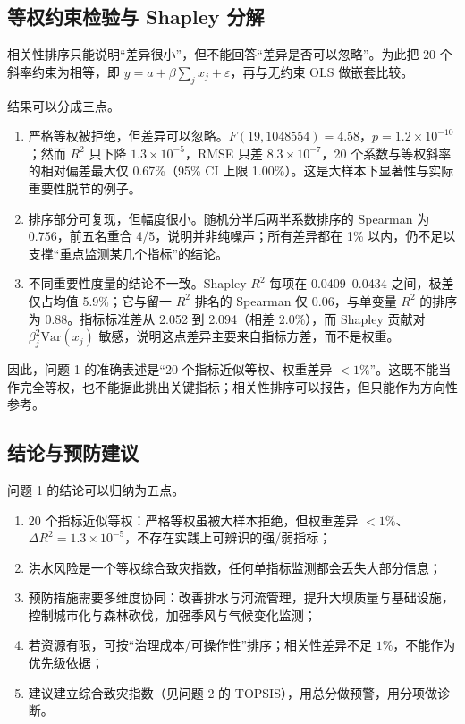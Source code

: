 \documentclass[12pt,a4paper]{ctexart}
\begin{document}
\subsection{等权约束检验与 Shapley 分解}

相关性排序只能说明“差异很小”，但不能回答“差异是否可以忽略”。为此把 20 个斜率约束为相等，即 \(y=a+\beta\sum_j x_j+\varepsilon\)，再与无约束 OLS 做嵌套比较。



结果可以分成三点。
\begin{enumerate}
  \item 严格等权被拒绝，但差异可以忽略。\(F(19,1048554)=4.58\)，\(p=1.2\times10^{-10}\)；然而 \(R^2\) 只下降 \(1.3\times10^{-5}\)，RMSE 只差 \(8.3\times10^{-7}\)，20 个系数与等权斜率的相对偏差最大仅 0.67\%（95\% CI 上限 1.00\%）。这是大样本下显著性与实际重要性脱节的例子。
  \item 排序部分可复现，但幅度很小。随机分半后两半系数排序的 Spearman 为 0.756，前五名重合 4/5，说明并非纯噪声；所有差异都在 1\% 以内，仍不足以支撑“重点监测某几个指标”的结论。
  \item 不同重要性度量的结论不一致。Shapley \(R^2\) 每项在 0.0409–0.0434 之间，极差仅占均值 5.9\%；它与留一 \(R^2\) 排名的 Spearman 仅 0.06，与单变量 \(R^2\) 的排序为 0.88。指标标准差从 2.052 到 2.094（相差 2.0\%），而 Shapley 贡献对 \(\beta_j^2\mathrm{Var}(x_j)\) 敏感，说明这点差异主要来自指标方差，而不是权重。
\end{enumerate}

因此，问题 1 的准确表述是“20 个指标近似等权、权重差异 $<1\%$”。这既不能当作完全等权，也不能据此挑出关键指标；相关性排序可以报告，但只能作为方向性参考。

\subsection{结论与预防建议}
问题 1 的结论可以归纳为五点。
\begin{enumerate}
  \item 20 个指标近似等权：严格等权虽被大样本拒绝，但权重差异 $<1\%$、$\Delta R^2=1.3\times10^{-5}$，不存在实践上可辨识的强/弱指标；
  \item 洪水风险是一个等权综合致灾指数，任何单指标监测都会丢失大部分信息；
  \item 预防措施需要多维度协同：改善排水与河流管理，提升大坝质量与基础设施，控制城市化与森林砍伐，加强季风与气候变化监测；
  \item 若资源有限，可按“治理成本/可操作性”排序；相关性差异不足 $1\%$，不能作为优先级依据；
  \item 建议建立综合致灾指数（见问题 2 的 TOPSIS），用总分做预警，用分项做诊断。
\end{enumerate}
\end{document}
